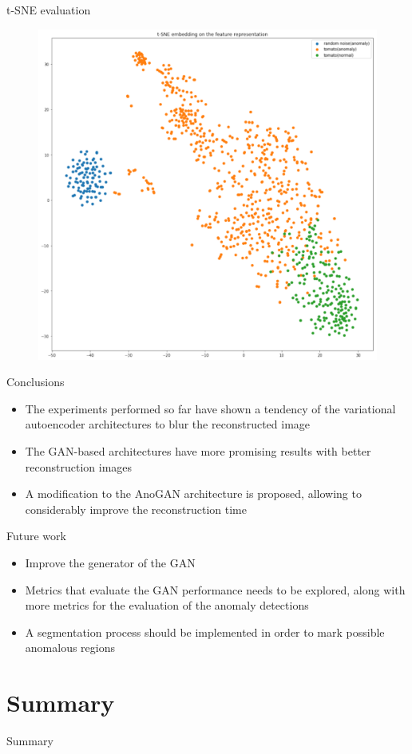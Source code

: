 \documentclass[15pt]{beamer} %
\begin{document}
\begin{frame}{t-SNE evaluation}
 \begin{figure}
  \centering
  \includegraphics[width=.6\textwidth]{anogan_t_sne2}
 \end{figure}
\end{frame}

\begin{frame}{Conclusions}
  
  \begin{itemize}
  \item The experiments performed so far have shown a tendency of the variational autoencoder
architectures to blur the reconstructed image
  \item  The GAN-based architectures have more
promising results with better reconstruction images
  \item A modification to the AnoGAN architecture is proposed, allowing to considerably improve
the reconstruction time
  \end{itemize}
  
\end{frame}

\begin{frame}{Future work}
  
  \begin{itemize}
  \item Improve the generator of the GAN
  \item Metrics that evaluate the GAN performance needs to be explored, along with more metrics for the evaluation of the anomaly detections
  \item A segmentation process should be implemented in order to mark possible anomalous regions
  \end{itemize}
  
\end{frame}


\section{Summary}

\begin{frame}{Summary}
  \tableofcontents
\end{frame}
\end{document}
